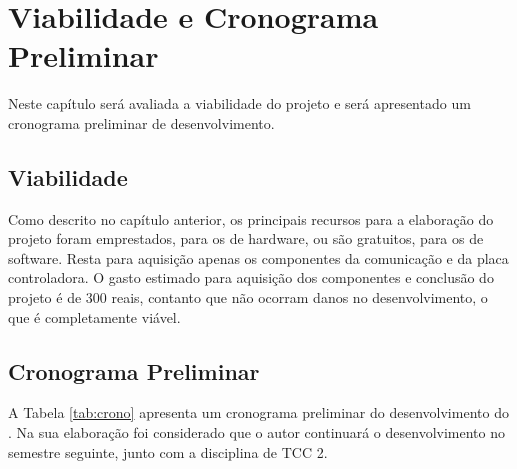 
\chapter{Viabilidade e Cronograma Preliminar} \label{cap:viabi}

Neste capítulo será avaliada a viabilidade do projeto e será apresentado um cronograma preliminar de desenvolvimento.


\section{Viabilidade}

Como descrito no capítulo anterior, os principais recursos para a elaboração do projeto foram emprestados, para os de hardware, ou são gratuitos, para os de software. Resta para aquisição apenas os componentes da comunicação e da placa controladora. O gasto estimado para aquisição dos componentes e conclusão do projeto é de 300 reais, contanto que não ocorram danos no desenvolvimento, o que é completamente viável.


\section{Cronograma Preliminar}

A Tabela \ref{tab:crono} apresenta um cronograma preliminar do desenvolvimento do . Na sua elaboração foi considerado que o autor continuará o desenvolvimento no semestre seguinte, junto com a disciplina de TCC 2.

